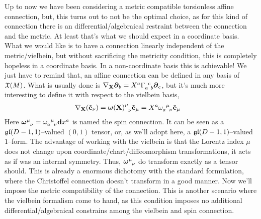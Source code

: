 Up to now we have been considering a metric compatible torsionless affine connection, but, this turns out to not be the optimal choice, as for this kind of connection 
there is an differential/algebraical restraint between the connection and the metric. At least that's what we should expect in a coordinate basis. What we would like is 
to have a connection linearly independent of the metric/vielbein, but without sacrificing the metricity condition, this is completely hopeless in a 
coordinate basis. In a non-coordinate basis this is achievable! We just have to remind that, an affine connection can be defined in any basis of $\mathfrak X\qty(M)$. What 
is usually done is $\nabla_{\vb X}\boldsymbol\partial_b=X^a\tensor{\Gamma}{_a^c_b}\boldsymbol\partial_c$, but it's much more interesting to define it with respect to the vielbein 
basis,
\begin{align*}
    \nabla_{\vb X}\qty(\tilde{\vb e}_\nu)&=\tensor{{\boldsymbol\omega(\vb X)}}{^\mu_\nu}\tilde{\vb e}_\mu=X^a\tensor{\omega}{_a^\mu_\nu}\tilde{\vb e}_\mu
\end{align*}
Here $\tensor{{\boldsymbol\omega}}{^\mu_\nu}=\tensor{\omega}{_a^\mu_\nu}\vb dx^a$ is named the spin connection. It can be seen as a $\mathfrak{gl}\qty(D-1,1)$--valued $(0,1)$ tensor, 
or, as we'll adopt here, a $\mathfrak{gl}\qty(D-1,1)$--valued $1$--form.
The advantage of working with the vielbein is that the Lorentz index $\mu$ 
does not change upon coordinate/chart/diffeomorphism transformations, it acts as if was an internal symmetry. Thus, 
$\tensor{{\boldsymbol\omega}}{^\mu_\nu}$ do transform exactly as a tensor should. This is already a enormous dichotomy 
with the standard formulation, where the Christoffel connection doesn't transform in a good manner. 
Now we'll impose the metric compatibility of the connection. 
This is another scenario where the vielbein formalism come to hand, as this condition imposes no additional differential/algebraical constrains among the vielbein and spin connection.
